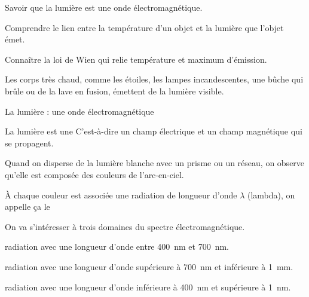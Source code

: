 \tetePremStssLumi
{}

\begin{objectifs}
  \item Savoir que la lumière est une onde électromagnétique.
  \item Comprendre le lien entre la température d'un objet et la lumière que l'objet émet.
  \item Connaître la loi de Wien qui relie température et maximum d'émission.
\end{objectifs}

\begin{contexte}
  Les corps très chaud, comme les étoiles, les lampes incandescentes, une bûche qui brûle ou de la lave en fusion, émettent de la lumière visible.
  
\end{contexte}


\begin{doc}{La lumière : une onde électromagnétique}
  \begin{importants}
    La lumière est une 
    C'est-à-dire un champ électrique et un champ magnétique qui se propagent.
  \end{importants}

  Quand on disperse de la lumière blanche avec un prisme ou un réseau, on observe qu'elle est composée des couleurs de l'arc-en-ciel.
  \begin{center}
  \end{center}
  \begin{center}
  \end{center}

  À chaque couleur est associée une radiation de longueur d'onde $\lambda$ (lambda), on appelle ça le 

  \begin{importants}    
    On va s'intéresser à trois domaines du spectre électromagnétique.
    \begin{listePoints}
      \item {} radiation avec une longueur d'onde entre \qty{400}{\nm} et \qty{700}{\nm}.
      \item {} radiation avec une longueur d'onde supérieure à \qty{700}{\nm} et inférieure à \qty{1}{\mm}.
      \item {} radiation avec une longueur d'onde inférieure à \qty{400}{\nm} et supérieure à \qty{1}{\nm}.
    \end{listePoints}
  \end{importants}
\end{doc}

